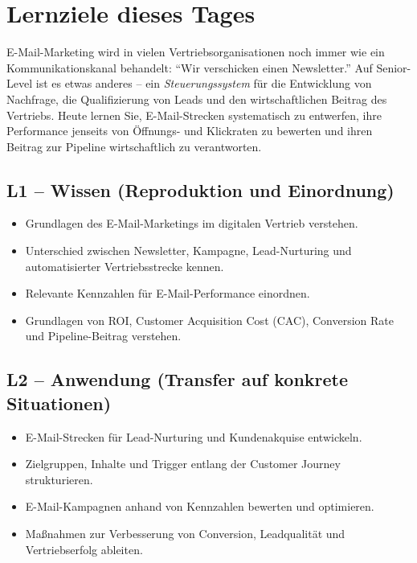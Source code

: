\documentclass[11pt,a4paper,oneside]{article}
\begin{document}
\section*{Lernziele dieses Tages}
\thispagestyle{plain}

\noindent E-Mail-Marketing wird in vielen Vertriebsorganisationen noch immer wie ein Kommunikationskanal behandelt: ``Wir verschicken einen Newsletter.'' Auf Senior-Level ist es etwas anderes -- ein \emph{Steuerungssystem} für die Entwicklung von Nachfrage, die Qualifizierung von Leads und den wirtschaftlichen Beitrag des Vertriebs. Heute lernen Sie, E-Mail-Strecken systematisch zu entwerfen, ihre Performance jenseits von Öffnungs- und Klickraten zu bewerten und ihren Beitrag zur Pipeline wirtschaftlich zu verantworten.

\subsection*{L1 -- Wissen (Reproduktion und Einordnung)}
\begin{itemize}
  \item Grundlagen des E-Mail-Marketings im digitalen Vertrieb verstehen.
  \item Unterschied zwischen Newsletter, Kampagne, Lead-Nurturing und automatisierter Vertriebsstrecke kennen.
  \item Relevante Kennzahlen für E-Mail-Performance einordnen.
  \item Grundlagen von ROI, Customer Acquisition Cost (CAC), Conversion Rate und Pipeline-Beitrag verstehen.
\end{itemize}

\subsection*{L2 -- Anwendung (Transfer auf konkrete Situationen)}
\begin{itemize}
  \item E-Mail-Strecken für Lead-Nurturing und Kundenakquise entwickeln.
  \item Zielgruppen, Inhalte und Trigger entlang der Customer Journey strukturieren.
  \item E-Mail-Kampagnen anhand von Kennzahlen bewerten und optimieren.
  \item Maßnahmen zur Verbesserung von Conversion, Leadqualität und Vertriebserfolg ableiten.
\end{itemize}
\end{document}
